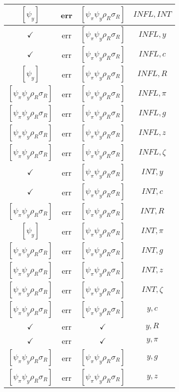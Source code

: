 \documentclass[a4paper,10pt]{article}
\begin{document}
\begin{longtable}{|c|c|c|c|}
\hline
$[\psi_y ]$ & err & $[\psi_\pi \psi_y \rho_R \sigma_R ]$ & ${INFL},{INT}$ \\
\hline
$\checkmark$ & err & $[\psi_\pi \psi_y \rho_R \sigma_R ]$ & ${INFL},{y}$ \\
\hline
$\checkmark$ & err & $[\psi_\pi \psi_y \rho_R \sigma_R ]$ & ${INFL},{c}$ \\
\hline
$[\psi_y ]$ & err & $[\psi_\pi \psi_y \rho_R \sigma_R ]$ & ${INFL},{R}$ \\
\hline
$[\psi_\pi \psi_y \rho_R \sigma_R ]$ & err & $[\psi_\pi \psi_y \rho_R \sigma_R ]$ & ${INFL},{\pi}$ \\
\hline
$[\psi_\pi \psi_y \rho_R \sigma_R ]$ & err & $[\psi_\pi \psi_y \rho_R \sigma_R ]$ & ${INFL},{g}$ \\
\hline
$[\psi_\pi \psi_y \rho_R \sigma_R ]$ & err & $[\psi_\pi \psi_y \rho_R \sigma_R ]$ & ${INFL},{z}$ \\
\hline
$[\psi_\pi \psi_y \rho_R \sigma_R ]$ & err & $[\psi_\pi \psi_y \rho_R \sigma_R ]$ & ${INFL},{\zeta}$ \\
\hline
$\checkmark$ & err & $[\psi_\pi \psi_y \rho_R \sigma_R ]$ & ${INT},{y}$ \\
\hline
$\checkmark$ & err & $[\psi_\pi \psi_y \rho_R \sigma_R ]$ & ${INT},{c}$ \\
\hline
$[\psi_\pi \psi_y \rho_R \sigma_R ]$ & err & $[\psi_\pi \psi_y \rho_R \sigma_R ]$ & ${INT},{R}$ \\
\hline
$[\psi_y ]$ & err & $[\psi_\pi \psi_y \rho_R \sigma_R ]$ & ${INT},{\pi}$ \\
\hline
$[\psi_\pi \psi_y \rho_R \sigma_R ]$ & err & $[\psi_\pi \psi_y \rho_R \sigma_R ]$ & ${INT},{g}$ \\
\hline
$[\psi_\pi \psi_y \rho_R \sigma_R ]$ & err & $[\psi_\pi \psi_y \rho_R \sigma_R ]$ & ${INT},{z}$ \\
\hline
$[\psi_\pi \psi_y \rho_R \sigma_R ]$ & err & $[\psi_\pi \psi_y \rho_R \sigma_R ]$ & ${INT},{\zeta}$ \\
\hline
$[\psi_\pi \psi_y \rho_R \sigma_R ]$ & err & $[\psi_\pi \psi_y \rho_R \sigma_R ]$ & ${y},{c}$ \\
\hline
$\checkmark$ & err & $\checkmark$ & ${y},{R}$ \\
\hline
$\checkmark$ & err & $\checkmark$ & ${y},{\pi}$ \\
\hline
$[\psi_\pi \psi_y \rho_R \sigma_R ]$ & err & $[\psi_\pi \psi_y \rho_R \sigma_R ]$ & ${y},{g}$ \\
\hline
$[\psi_\pi \psi_y \rho_R \sigma_R ]$ & err & $[\psi_\pi \psi_y \rho_R \sigma_R ]$ & ${y},{z}$ \\

\end{longtable}
\end{document}
